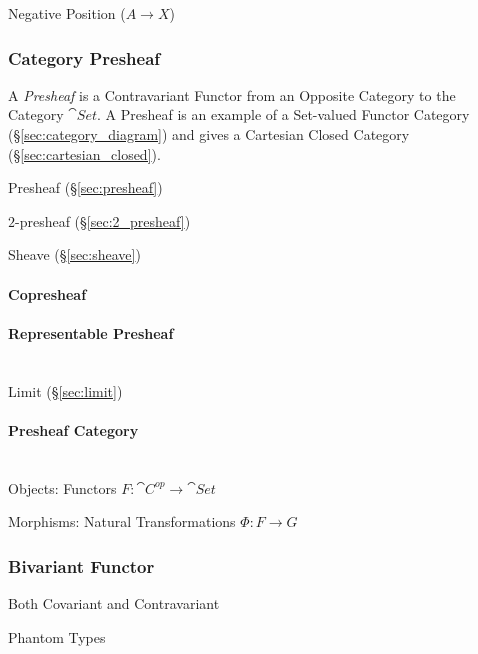 Negative Position ($A \rightarrow X$)



\subsubsection{Category Presheaf}\label{sec:category_presheaf}

A \emph{Presheaf} is a Contravariant Functor from an Opposite Category
to the Category $\cat{Set}$. A Presheaf is an example of a
Set-valued Functor Category (\S\ref{sec:category_diagram}) and gives a
Cartesian Closed Category (\S\ref{sec:cartesian_closed}).

Presheaf (\S\ref{sec:presheaf})

$2$-presheaf (\S\ref{sec:2_presheaf})

Sheave (\S\ref{sec:sheave})



\paragraph{Copresheaf}\label{sec:copresheaf}



\paragraph{Representable Presheaf}\label{sec:representable_presheaf}
\hfill \\

Limit (\S\ref{sec:limit})



\paragraph{Presheaf Category}\label{sec:presheaf_category}
\hfill \\

Objects: Functors $F: \cat{C}^{op} \rightarrow \cat{Set}$

Morphisms: Natural Transformations $\Phi : F \rightarrow G$



\subsubsection{Bivariant Functor} \label{sec:bivariant_functor}

Both Covariant and Contravariant

Phantom Types %



